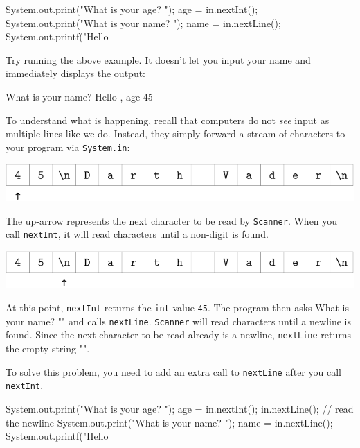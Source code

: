 \documentclass[12pt]{book}
\theoremstyle{exercise}
\newcommand{\java}[1]{\verb"#1"}
\newcommand{\java}[1]{\lstinline{#1}} %
\begin{document}
\begin{code}
    System.out.print("What is your age? ");
    age = in.nextInt();
    System.out.print("What is your name? ");
    name = in.nextLine();
    System.out.printf("Hello %
\end{code}

Try running the above example.
It doesn't let you input your name and immediately displays the output:

\begin{stdout}
What is your name? Hello , age 45
\end{stdout}

To understand what is happening, recall that computers do not {\em see} input as multiple lines like we do.
Instead, they simply forward a stream of characters to your program via \java{System.in}:

\begin{center}
\includegraphics{figs/vader1.pdf}
\end{center}

The up-arrow represents the next character to be read by \java{Scanner}.
When you call \java{nextInt}, it will read characters until a non-digit is found.

\begin{center}
\includegraphics{figs/vader2.pdf}
\end{center}

At this point, \java{nextInt} returns the \java{int} value \java{45}.
The program then asks \java{"What is your name? "} and calls \java{nextLine}.
\java{Scanner} will read characters until a newline is found.
Since the next character to be read already is a newline, \java{nextLine} returns the empty string \java{""}.

To solve this problem, you need to add an extra call to \java{nextLine} after you call \java{nextInt}.

\begin{code}
    System.out.print("What is your age? ");
    age = in.nextInt();
    in.nextLine();  // read the newline
    System.out.print("What is your name? ");
    name = in.nextLine();
    System.out.printf("Hello %
\end{code}
\end{document}
